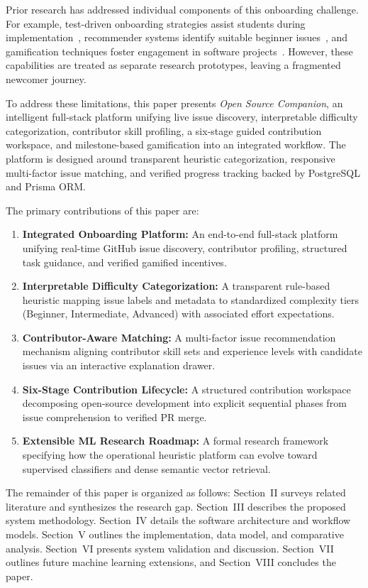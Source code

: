 \documentclass[conference]{IEEEtran}
\begin{document}
Prior research has addressed individual components of this onboarding challenge. For example, test-driven onboarding strategies assist students during implementation~\cite{hu2019test}, recommender systems identify suitable beginner issues~\cite{xiao2023personalized}, and gamification techniques foster engagement in software projects~\cite{diniz2017using, santos2025ossdoorway}. However, these capabilities are treated as separate research prototypes, leaving a fragmented newcomer journey.

To address these limitations, this paper presents \textit{Open Source Companion}, an intelligent full-stack platform unifying live issue discovery, interpretable difficulty categorization, contributor skill profiling, a six-stage guided contribution workspace, and milestone-based gamification into an integrated workflow. The platform is designed around transparent heuristic categorization, responsive multi-factor issue matching, and verified progress tracking backed by PostgreSQL and Prisma ORM.

The primary contributions of this paper are:
\begin{enumerate}
    \item \textbf{Integrated Onboarding Platform:} An end-to-end full-stack platform unifying real-time GitHub issue discovery, contributor profiling, structured task guidance, and verified gamified incentives.
    \item \textbf{Interpretable Difficulty Categorization:} A transparent rule-based heuristic mapping issue labels and metadata to standardized complexity tiers (Beginner, Intermediate, Advanced) with associated effort expectations.
    \item \textbf{Contributor-Aware Matching:} A multi-factor issue recommendation mechanism aligning contributor skill sets and experience levels with candidate issues via an interactive explanation drawer.
    \item \textbf{Six-Stage Contribution Lifecycle:} A structured contribution workspace decomposing open-source development into explicit sequential phases from issue comprehension to verified PR merge.
    \item \textbf{Extensible ML Research Roadmap:} A formal research framework specifying how the operational heuristic platform can evolve toward supervised classifiers and dense semantic vector retrieval.
\end{enumerate}

The remainder of this paper is organized as follows: Section~II surveys related literature and synthesizes the research gap. Section~III describes the proposed system methodology. Section~IV details the software architecture and workflow models. Section~V outlines the implementation, data model, and comparative analysis. Section~VI presents system validation and discussion. Section~VII outlines future machine learning extensions, and Section~VIII concludes the paper.
\end{document}
